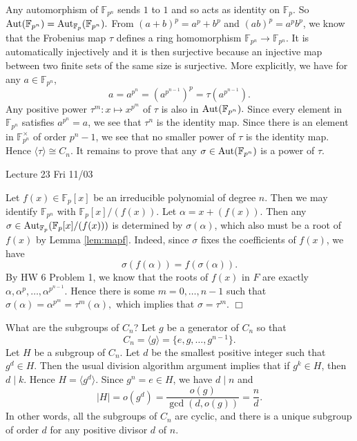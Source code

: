 \documentclass{article}
\def\Aut{{\rm Aut}}
\def\F{{\mathbb F}}
\def\F{{\mathbb F}}
\newenvironment{proof}{\noindent {\bf Proof:}}{$\Box$ \vspace{2 ex}}
\newcommand{\add}[1]{{\color{blue} #1}}
\begin{document}
    \begin{proof}
        Any automorphism of $\F_{p^n}$ sends $1$ to $1$ and so acts as identity on $\F_p$. So $\Aut(\F_{p^n}) = \Aut_{\F_p}(\F_{p^n}).$ From $(a+b)^p = a^p + b^p$ and $(ab)^p = a^pb^p$, we know that the Frobenius map $\tau$ defines a ring homomorphism $\F_{p^n}\rightarrow\F_{p^n}$. It is automatically injectively and it is then surjective because an injective map between two finite sets of the same size is surjective. More explicitly, we have for any $a\in \F_{p^n}$, $$a = a^{p^n} = (a^{p^{n-1}})^p = \tau(a^{p^{n-1}}).$$ Any positive power $\tau^m:x\mapsto x^{p^m}$ of $\tau$ is also in $\Aut(\F_{p^n}).$ Since every element in $\F_{p^n}$ satisfies $a^{p^n} = a$, we see that $\tau^n$ is the identity map. Since there is an element in $\F_{p^n}^\times$ of order $p^n - 1$, we see that no smaller power of $\tau$ is the identity map. Hence $\langle \tau\rangle \cong C_n$. It remains to prove that any $\sigma\in\Aut(\F_{p^n})$ is a power of $\tau$.

\begin{center}
    \add{Lecture 23 Fri 11/03}
\end{center}
        
        Let $f(x)\in\F_p[x]$ be an irreducible polynomial of degree $n$. Then we may identify $\F_{p^n}$ with $\F_p[x]/(f(x))$. Let $\alpha = x + (f(x))$. Then any $\sigma\in\Aut_{\F_p}(\F_p[x]/(f(x)))$ is determined by $\sigma(\alpha)$, which also must be a root of $f(x)$ by Lemma \ref{lem:mapf}. Indeed, since $\sigma$ fixes the coefficients of $f(x)$, we have
        $$\sigma(f(\alpha)) = f(\sigma(\alpha)).$$ By HW 6 Problem 1, we know that the roots of $f(x)$ in $F$ are exactly $\alpha, \alpha^p,\ldots,\alpha^{p^{n-1}}.$ Hence there is some $m = 0,\ldots,n-1$ such that $\sigma(\alpha) = \alpha^{p^m} = \tau^m(\alpha),$ which implies that $\sigma = \tau^m.$ 
    \end{proof}



What are the subgroups of $C_n$? Let $g$ be a generator of $C_n$ so that $$C_n = \langle g\rangle = \{e,g,\ldots,g^{n-1}\}.$$
Let $H$ be a subgroup of $C_n$. Let $d$ be the smallest positive integer such that $g^d\in H$. Then the usual division algorithm argument implies that if $g^k\in H$, then $d\mid k$. Hence $H = \langle g^d \rangle$. Since $g^n = e\in H$, we have $d\mid n$ and $$|H| = o(g^d) = \frac{o(g)}{\gcd(d, o(g))} = \frac{n}{d}.$$
In other words, all the subgroups of $C_n$ are cyclic, and there is a unique subgroup of order $d$ for any positive divisor $d$ of $n$.
\end{document}
